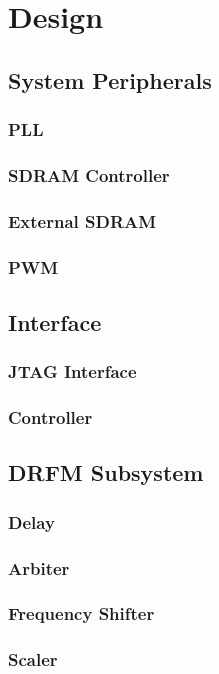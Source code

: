 \section{Design}
	
	\subsection{System Peripherals}
		\subsubsection{PLL}
		\subsubsection{SDRAM Controller}
		\subsubsection{External SDRAM}
		\subsubsection{PWM}
	
	\subsection{Interface}
		\subsubsection{JTAG Interface}
		\subsubsection{Controller}
		
	\subsection{DRFM Subsystem}
		\subsubsection{Delay}
		\subsubsection{Arbiter}
		\subsubsection{Frequency Shifter}
		\subsubsection{Scaler}
